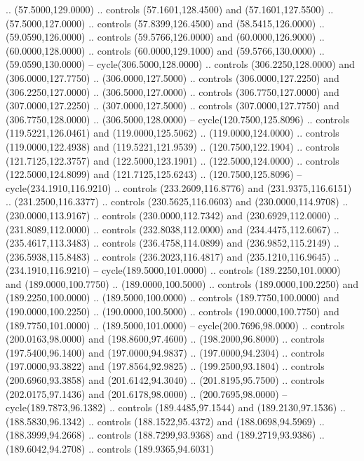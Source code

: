   .. (57.5000,129.0000) .. controls (57.1601,128.4500) and (57.1601,127.5500) ..
  (57.5000,127.0000) .. controls (57.8399,126.4500) and (58.5415,126.0000) ..
  (59.0590,126.0000) .. controls (59.5766,126.0000) and (60.0000,126.9000) ..
  (60.0000,128.0000) .. controls (60.0000,129.1000) and (59.5766,130.0000) ..
  (59.0590,130.0000) -- cycle(306.5000,128.0000) .. controls (306.2250,128.0000)
  and (306.0000,127.7750) .. (306.0000,127.5000) .. controls (306.0000,127.2250)
  and (306.2250,127.0000) .. (306.5000,127.0000) .. controls (306.7750,127.0000)
  and (307.0000,127.2250) .. (307.0000,127.5000) .. controls (307.0000,127.7750)
  and (306.7750,128.0000) .. (306.5000,128.0000) -- cycle(120.7500,125.8096) ..
  controls (119.5221,126.0461) and (119.0000,125.5062) .. (119.0000,124.0000) ..
  controls (119.0000,122.4938) and (119.5221,121.9539) .. (120.7500,122.1904) ..
  controls (121.7125,122.3757) and (122.5000,123.1901) .. (122.5000,124.0000) ..
  controls (122.5000,124.8099) and (121.7125,125.6243) .. (120.7500,125.8096) --
  cycle(234.1910,116.9210) .. controls (233.2609,116.8776) and
  (231.9375,116.6151) .. (231.2500,116.3377) .. controls (230.5625,116.0603) and
  (230.0000,114.9708) .. (230.0000,113.9167) .. controls (230.0000,112.7342) and
  (230.6929,112.0000) .. (231.8089,112.0000) .. controls (232.8038,112.0000) and
  (234.4475,112.6067) .. (235.4617,113.3483) .. controls (236.4758,114.0899) and
  (236.9852,115.2149) .. (236.5938,115.8483) .. controls (236.2023,116.4817) and
  (235.1210,116.9645) .. (234.1910,116.9210) -- cycle(189.5000,101.0000) ..
  controls (189.2250,101.0000) and (189.0000,100.7750) .. (189.0000,100.5000) ..
  controls (189.0000,100.2250) and (189.2250,100.0000) .. (189.5000,100.0000) ..
  controls (189.7750,100.0000) and (190.0000,100.2250) .. (190.0000,100.5000) ..
  controls (190.0000,100.7750) and (189.7750,101.0000) .. (189.5000,101.0000) --
  cycle(200.7696,98.0000) .. controls (200.0163,98.0000) and (198.8600,97.4600)
  .. (198.2000,96.8000) .. controls (197.5400,96.1400) and (197.0000,94.9837) ..
  (197.0000,94.2304) .. controls (197.0000,93.3822) and (197.8564,92.9825) ..
  (199.2500,93.1804) .. controls (200.6960,93.3858) and (201.6142,94.3040) ..
  (201.8195,95.7500) .. controls (202.0175,97.1436) and (201.6178,98.0000) ..
  (200.7695,98.0000) -- cycle(189.7873,96.1382) .. controls (189.4485,97.1544)
  and (189.2130,97.1536) .. (188.5830,96.1342) .. controls (188.1522,95.4372)
  and (188.0698,94.5969) .. (188.3999,94.2668) .. controls (188.7299,93.9368)
  and (189.2719,93.9386) .. (189.6042,94.2708) .. controls (189.9365,94.6031)
